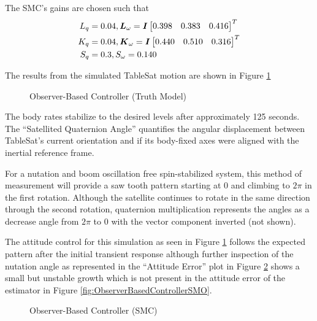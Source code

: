 The SMC's gains are chosen such that
\begin{equation}
  \begin{aligned}
    L_q &= 0.04, \boldsymbol{L}_{\omega} = \boldsymbol{I} \begin{bmatrix} 0.398 & 0.383 & 0.416 \end{bmatrix}^T \\
    K_q &= 0.04, \boldsymbol{K}_{\omega} = \boldsymbol{I} \begin{bmatrix} 0.440 & 0.510 & 0.316 \end{bmatrix}^T \\
    S_q &= 0.3, S_{\omega} = 0.140
  \end{aligned}
\end{equation}


The results from the simulated TableSat motion are shown in Figure \ref{fig:ObserverBasedControllerTruth}
\begin{figure}[H]
  \centerline{}
  \caption{Observer-Based Controller (Truth Model)}
  \label{fig:ObserverBasedControllerTruth}
\end{figure}

The body rates stabilize to the desired levels after approximately 125 seconds.  The ``Satellited Quaternion Angle'' quantifies the angular displacement between TableSat's current orientation and if its body-fixed axes were aligned with the inertial reference frame.

For a nutation and boom oscillation free spin-stabilized system, this method of measurement will provide a saw tooth pattern starting at 0 and climbing to $2\pi$ in the first rotation.  Although the satellite continues to rotate in the same direction through the second rotation, quaternion multiplication represents the angles as a decrease angle from $2\pi$ to 0 with the vector component inverted (not shown).

The attitude control for this simulation as seen in Figure \ref{fig:ObserverBasedControllerTruth} follows the expected pattern after the initial transient response although further inspection of the nutation angle as represented in the ``Attitude Error'' plot in Figure \ref{fig:ObserverBasedControllerSMC} shows a small but unstable growth which is not present in the attitude error of the estimator in Figure \ref{fig:ObserverBasedControllerSMO}.
\begin{figure}[H]
  \centerline{}
  \caption{Observer-Based Controller (SMC)}
  \label{fig:ObserverBasedControllerSMC}
\end{figure}

